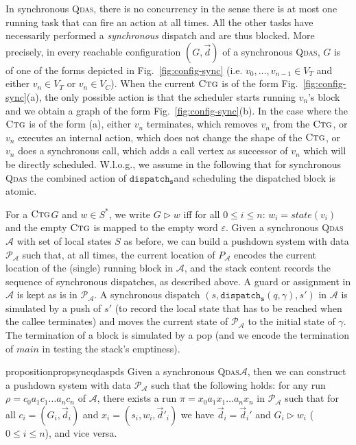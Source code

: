 \documentclass[runningheads,oribibl,]{article}
\newif\ifincludeproofs
\newcommand{\Aa}{\ensuremath{\mathcal{A}}\xspace}
\newcommand{\Pp}{\ensuremath{\mathcal{P}}\xspace}
\newcommand{\e}{\ensuremath{\varepsilon}\xspace}
\newcommand{\cfont}[1]{\ensuremath{\mathtt{#1}}\xspace}
\newcommand{\qdas}{\textsc{Qdas}\xspace}
\newcommand{\Graph}{\ensuremath{G}}
\newcommand{\Data}{\ensuremath{\vec{d}}}
\newcommand{\state}{\ensuremath{\textit{state}}}
\newcommand{\ctg}{\ensuremath{\textsc{Ctg}}\xspace}
\newcommand{\disps}{\ensuremath{\cfont{dispatch_s}}}
\newcommand{\inputproof}[1]{\ifincludeproofs\else\fi}
\begin{document}
In synchronous \qdas, there is no concurrency in the sense there is at
most one running task that can fire an action at all times. All the
other tasks have necessarily performed a \emph{synchronous} dispatch
and are thus blocked. More precisely, in every reachable configuration
$(\Graph,\Data)$ of a synchronous \qdas, $\Graph$ is of one of the
forms depicted in Fig.~\ref{fig:config-sync}
(i.e. $v_0,\dots,v_{n-1}\in V_T$ and either $v_n\in V_T$ or $v_n\in
V_C$). When the current \ctg is of the form
Fig.~\ref{fig:config-sync}(a), the only possible action is that the
scheduler starts running $v_n$'s block and we obtain a graph of the
form Fig.~\ref{fig:config-sync}(b). In the case where the \ctg is of
the form (a), either $v_n$ terminates, which removes $v_n$ from the
\ctg, or $v_n$ executes an internal action, which does not change the
shape of the \ctg, or $v_n$ does a synchronous call, which adds a call
vertex as successor of $v_n$ which will be directly
scheduled. W.l.o.g., we assume in the following that for synchronous
\qdas the combined action of \disps and scheduling the dispatched
block is atomic.



                                For a \ctg $\Graph$ and $w\in S^*$, we write
 $\Graph\triangleright w$ iff for all $0\leq i\leq n$:
$w_i=\state(v_i)$ and the empty \ctg is mapped to the empty word $\e$.
Given a synchronous \qdas $\Aa$ with set of local
states $S$ as before, we can build a pushdown system with data
$\Pp_\Aa$ such that, at all times, the current location of $P_\Aa$ encodes the
current location of the (single) running block in $\Aa$, and the stack
content records the sequence of synchronous dispatches, as described
above. A guard or assignment in $\Aa$ is kept as is in $\Pp_\Aa$. A
synchronous dispatch $(s,\disps(q,\gamma),s')$ in $\Aa$ is simulated
by a push of $s'$ (to record the local state that has to be reached
when the callee terminates) and moves the current state of $\Pp_\Aa$ to
the initial state of $\gamma$. The termination of a block is simulated
by a pop (and we encode the termination of
$main$ in testing the stack's emptiness).

\begin{restatable}{proposition}{propsyncqdaspds}
\label{prop:sync_qdas_pds}  Given a synchronous \qdas $\Aa$, then we can construct  a
  pushdown system with data $\Pp_\Aa$ such that the following holds:
  for any
  run $\rho=c_0a_1c_1\dots a_nc_n$ of $\Aa$,
  there exists a run $\pi=x_0a_1x_1\dots a_nx_n$ in $\Pp_\Aa$ such that
  for all $c_i=(\Graph_i,\Data_i)$ and $x_i=(s_i,w_i,\Data'_i)$
  we have $\Data_i=\Data_i'$ and $\Graph_i\triangleright w_i$ ($0\leq i \leq n$),
  and vice versa.
\end{restatable}
\inputproof{proofs/lem:sync_qdas_pds.tex}
\end{document}
